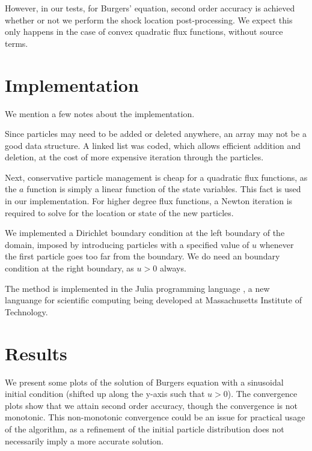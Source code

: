\documentclass{article}
\begin{document}
However, in our tests, for Burgers' equation, second order accuracy is achieved whether or not we perform the shock location post-processing. We expect this only happens in the case of convex quadratic flux functions, without source terms.

\section{Implementation}
We mention a few notes about the implementation.

Since particles may need to be added or deleted anywhere, an array may not be a good data structure. A linked list was coded, which allows efficient addition and deletion, at the cost of more expensive iteration through the particles.

Next, conservative particle management is cheap for a quadratic flux functions, as the $a$ function is simply a linear function of the state variables. This fact is used in our implementation. For higher degree flux functions, a Newton iteration is required to solve for the location or state of the new particles.

We implemented a Dirichlet boundary condition at the left boundary of the domain, imposed by introducing particles with a specified value of $u$ whenever the first particle goes too far from the boundary. We do need an boundary condition at the right boundary, as $u>0$ always.

The method is implemented in the Julia programming language \cite{julia}, a new languange for scientific computing being developed at Massachusetts Institute of Technology.

\section{Results}

We present some plots of the solution of Burgers equation with a sinusoidal initial condition (shifted up along the y-axis such that $u>0$). The convergence plots show that we attain second order accuracy, though the convergence is not monotonic. This non-monotonic convergence could be an issue for practical usage of the algorithm, as a refinement of the initial particle distribution does not necessarily imply a more accurate solution.
\end{document}
